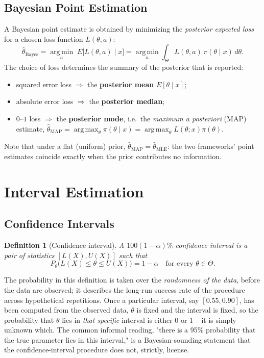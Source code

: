 \documentclass[11pt,a4paper]{article}
\newtheorem{definition}{Definition}[section]
\begin{document}
\subsection{Bayesian Point Estimation}
A Bayesian point estimate is obtained by minimizing the \emph{posterior expected loss} for a chosen loss function $L(\theta, a)$:
\begin{equation}
\hat\theta_{\text{Bayes}} = \operatorname*{arg\,min}_{a} \; E\big[L(\theta, a) \mid x\big] = \operatorname*{arg\,min}_{a} \int_\Theta L(\theta, a)\, \pi(\theta \mid x)\, d\theta.
\end{equation}
The choice of loss determines the summary of the posterior that is reported:
\begin{itemize}[leftmargin=2em]
  \item squared error loss $\Rightarrow$ the \textbf{posterior mean} $E[\theta \mid x]$;
  \item absolute error loss $\Rightarrow$ the \textbf{posterior median};
  \item $0$--$1$ loss $\Rightarrow$ the \textbf{posterior mode}, i.e.\ the \emph{maximum a posteriori} (MAP) estimate, $\hat\theta_{\text{MAP}} = \operatorname*{arg\,max}_\theta \pi(\theta\mid x) = \operatorname*{arg\,max}_\theta L(\theta;x)\pi(\theta)$.
\end{itemize}
Note that under a flat (uniform) prior, $\hat\theta_{\text{MAP}} = \hat\theta_{\text{MLE}}$: the two frameworks' point estimates coincide exactly when the prior contributes no information.

\section{Interval Estimation}

\subsection{Confidence Intervals}
\begin{definition}[Confidence interval]
A $100(1-\alpha)\%$ confidence interval is a pair of statistics $[L(X), U(X)]$ such that
\begin{equation}
P_\theta\big(L(X) \le \theta \le U(X)\big) = 1-\alpha \quad \text{for every } \theta \in \Theta.
\end{equation}
\end{definition}
The probability in this definition is taken over the \emph{randomness of the data}, before the data are observed; it describes the long-run success rate of the procedure across hypothetical repetitions. Once a particular interval, say $[0.55, 0.90]$, has been computed from the observed data, $\theta$ is fixed and the interval is fixed, so the probability that $\theta$ lies in \emph{that specific} interval is either 0 or 1 -- it is simply unknown which. The common informal reading, "there is a 95\% probability that the true parameter lies in this interval," is a Bayesian-sounding statement that the confidence-interval procedure does not, strictly, license.
\end{document}
